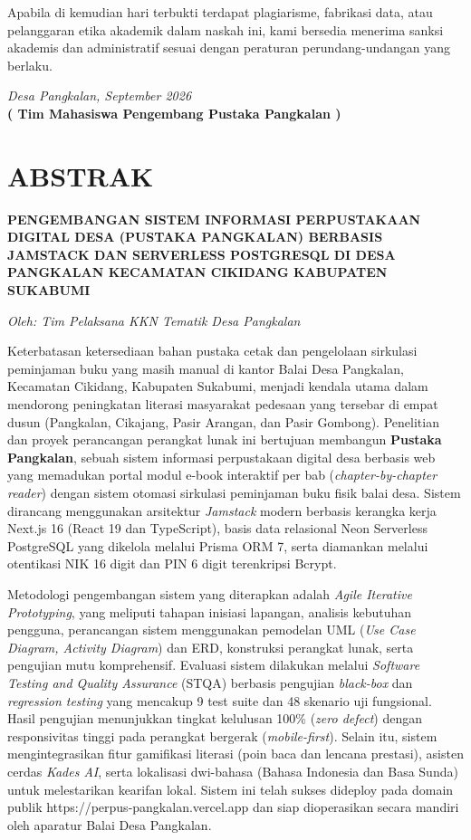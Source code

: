 \documentclass[
  indonesian,
  12pt,
]{report}
\begin{document}
Apabila di kemudian hari terbukti terdapat plagiarisme, fabrikasi data,
atau pelanggaran etika akademik dalam naskah ini, kami bersedia menerima
sanksi akademis dan administratif sesuai dengan peraturan
perundang-undangan yang berlaku.

\vspace{1.2cm}

\emph{Desa Pangkalan, September 2026}\\
\vspace{1.2cm} \textbf{( Tim Mahasiswa Pengembang Pustaka Pangkalan )}

\newpage

\chapter*{ABSTRAK}\label{abstrak}

\textbf{PENGEMBANGAN SISTEM INFORMASI PERPUSTAKAAN DIGITAL DESA (PUSTAKA
PANGKALAN) BERBASIS JAMSTACK DAN SERVERLESS POSTGRESQL DI DESA PANGKALAN
KECAMATAN CIKIDANG KABUPATEN SUKABUMI}

\emph{Oleh: Tim Pelaksana KKN Tematik Desa Pangkalan}

Keterbatasan ketersediaan bahan pustaka cetak dan pengelolaan sirkulasi
peminjaman buku yang masih manual di kantor Balai Desa Pangkalan,
Kecamatan Cikidang, Kabupaten Sukabumi, menjadi kendala utama dalam
mendorong peningkatan literasi masyarakat pedesaan yang tersebar di
empat dusun (Pangkalan, Cikajang, Pasir Arangan, dan Pasir Gombong).
Penelitian dan proyek perancangan perangkat lunak ini bertujuan
membangun \textbf{Pustaka Pangkalan}, sebuah sistem informasi
perpustakaan digital desa berbasis web yang memadukan portal modul
e-book interaktif per bab (\emph{chapter-by-chapter reader}) dengan
sistem otomasi sirkulasi peminjaman buku fisik balai desa. Sistem
dirancang menggunakan arsitektur \emph{Jamstack} modern berbasis
kerangka kerja Next.js 16 (React 19 dan TypeScript), basis data
relasional Neon Serverless PostgreSQL yang dikelola melalui Prisma ORM
7, serta diamankan melalui otentikasi NIK 16 digit dan PIN 6 digit
terenkripsi Bcrypt.

Metodologi pengembangan sistem yang diterapkan adalah \emph{Agile
Iterative Prototyping}, yang meliputi tahapan inisiasi lapangan,
analisis kebutuhan pengguna, perancangan sistem menggunakan pemodelan
UML (\emph{Use Case Diagram, Activity Diagram}) dan ERD, konstruksi
perangkat lunak, serta pengujian mutu komprehensif. Evaluasi sistem
dilakukan melalui \emph{Software Testing and Quality Assurance} (STQA)
berbasis pengujian \emph{black-box} dan \emph{regression testing} yang
mencakup 9 test suite dan 48 skenario uji fungsional. Hasil pengujian
menunjukkan tingkat kelulusan 100\% (\emph{zero defect}) dengan
responsivitas tinggi pada perangkat bergerak (\emph{mobile-first}).
Selain itu, sistem mengintegrasikan fitur gamifikasi literasi (poin baca
dan lencana prestasi), asisten cerdas \emph{Kades AI}, serta lokalisasi
dwi-bahasa (Bahasa Indonesia dan Basa Sunda) untuk melestarikan kearifan
lokal. Sistem ini telah sukses dideploy pada domain publik
https://perpus-pangkalan.vercel.app dan siap dioperasikan secara mandiri
oleh aparatur Balai Desa Pangkalan.
\end{document}
